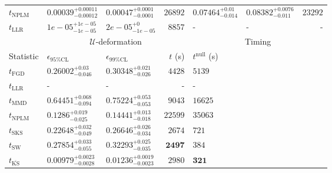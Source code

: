 \begin{tabular}{l|llr|llr}
\rowcolor{red!35}	$t_{\mathrm{NPLM}}$ & $0.00039_{-0.00012}^{+0.00011}$ & $0.00047_{-0.0001}^{+0.0001}$ & $26892$ & $0.07464_{-0.014}^{+0.01}$ & $0.08382_{-0.011}^{+0.0076}$ & $23292$ \\
	$t_{\mathrm{LLR}}$ & $1e-05_{-1e-05}^{+1e-05}$ & $2e-05_{-1e-05}^{+0}$ & $8857$ & - & - & - \\
	\toprule
	\multicolumn{1}{c}{} & \multicolumn{3}{c}{$\mathcal{U}$-deformation} & \multicolumn{3}{c}{Timing} \\
	Statistic & $\epsilon_{95\%\mathrm{CL}}$ & $\epsilon_{99\%\mathrm{CL}}$ & $t$ (s) & $t^{\mathrm{null}}$ (s) \\
	\midrule
	$t_{\mathrm{FGD}}$ & $0.26002_{-0.046}^{+0.03}$ & $0.30348_{-0.026}^{+0.021}$ & $4428$ & $5139$ \\
	$t_{\mathrm{LLR}}$ & - & - & - & - \\
	$t_{\mathrm{MMD}}$ & $0.64451_{-0.094}^{+0.068}$ & $0.75224_{-0.053}^{+0.053}$ & $9043$ & $16625$ \\
\rowcolor{red!35}	$t_{\mathrm{NPLM}}$ & $0.1286_{-0.025}^{+0.019}$ & $0.14441_{-0.018}^{+0.013}$ & $22599$ & $35063$ \\
	$t_{\mathrm{SKS}}$ & $0.22648_{-0.049}^{+0.032}$ & $0.26646_{-0.034}^{+0.026}$ & $2674$ & $721$ \\
	$t_{\mathrm{SW}}$ & $0.27854_{-0.055}^{+0.033}$ & $0.32293_{-0.035}^{+0.025}$ & ${\mathbf{2497}}$ & $384$ \\
	$t_{\overline{\mathrm{KS}}}$ & ${\mathbf{0.00979_{-0.0028}^{+0.0023}}}$ & ${\mathbf{0.01236_{-0.0023}^{+0.0019}}}$ & $2980$ & ${\mathbf{321}}$ \\
	\bottomrule
\end{tabular}